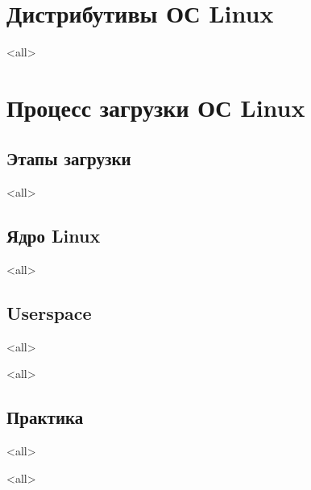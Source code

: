 \section{Дистрибутивы ОС Linux}

\mode<all>{}

\section{Процесс загрузки ОС Linux}

\subsection{Этапы загрузки}

\mode<all>{}

\subsection{Ядро Linux}

\mode<all>{}

\subsection{Userspace}

\mode<all>{}

\mode<all>{}

\subsection{Практика}

\mode<all>{}


\mode<all>

